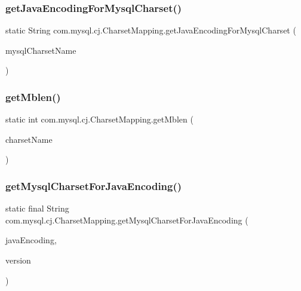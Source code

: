 \subsubsection{\texorpdfstring{get\+Java\+Encoding\+For\+Mysql\+Charset()}{getJavaEncodingForMysqlCharset()}\hspace{0.1cm}{\footnotesize\ttfamily [2/2]}}
{\footnotesize\ttfamily static String com.\+mysql.\+cj.\+Charset\+Mapping.\+get\+Java\+Encoding\+For\+Mysql\+Charset (\begin{DoxyParamCaption}\item[{String}]{mysql\+Charset\+Name }\end{DoxyParamCaption})\hspace{0.3cm}{\ttfamily [static]}}

\mbox{\label{classcom_1_1mysql_1_1cj_1_1_charset_mapping_af089a4b1c57135f56e6112fc1abdaeae}} 
\subsubsection{\texorpdfstring{get\+Mblen()}{getMblen()}}
{\footnotesize\ttfamily static int com.\+mysql.\+cj.\+Charset\+Mapping.\+get\+Mblen (\begin{DoxyParamCaption}\item[{String}]{charset\+Name }\end{DoxyParamCaption})\hspace{0.3cm}{\ttfamily [static]}}

\mbox{\label{classcom_1_1mysql_1_1cj_1_1_charset_mapping_a45a0491159f7d586e8b73253f8a7d66f}} 
\subsubsection{\texorpdfstring{get\+Mysql\+Charset\+For\+Java\+Encoding()}{getMysqlCharsetForJavaEncoding()}}
{\footnotesize\ttfamily static final String com.\+mysql.\+cj.\+Charset\+Mapping.\+get\+Mysql\+Charset\+For\+Java\+Encoding (\begin{DoxyParamCaption}\item[{String}]{java\+Encoding,  }\item[{\mbox{\hyperlink{classcom_1_1mysql_1_1cj_1_1_server_version}{Server\+Version}}}]{version }\end{DoxyParamCaption})\hspace{0.3cm}{\ttfamily [static]}}

